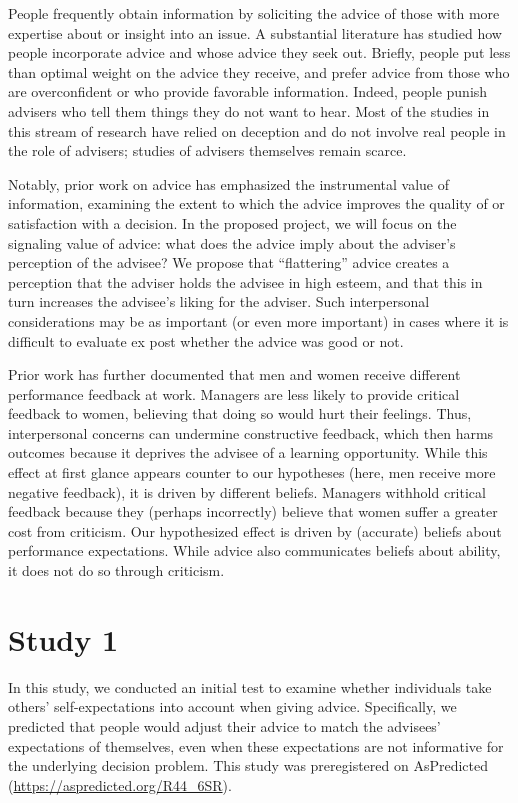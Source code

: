 \documentclass[
  man,floatsintext]{apa6}
\begin{document}
People frequently obtain information by soliciting the advice of those with more expertise about or insight into an issue. A substantial literature has studied how people incorporate advice and whose advice they seek out. Briefly, people put less than optimal weight on the advice they receive, and prefer advice from those who are overconfident or who provide favorable information. Indeed, people punish advisers who tell them things they do not want to hear. Most of the studies in this stream of research have relied on deception and do not involve real people in the role of advisers; studies of advisers themselves remain scarce.

Notably, prior work on advice has emphasized the instrumental value of information, examining the extent to which the advice improves the quality of or satisfaction with a decision. In the proposed project, we will focus on the signaling value of advice: what does the advice imply about the adviser's perception of the advisee? We propose that ``flattering'' advice creates a perception that the adviser holds the advisee in high esteem, and that this in turn increases the advisee's liking for the adviser. Such interpersonal considerations may be as important (or even more important) in cases where it is difficult to evaluate ex post whether the advice was good or not.

Prior work has further documented that men and women receive different performance feedback at work. Managers are less likely to provide critical feedback to women, believing that doing so would hurt their feelings. Thus, interpersonal concerns can undermine constructive feedback, which then harms outcomes because it deprives the advisee of a learning opportunity. While this effect at first glance appears counter to our hypotheses (here, men receive more negative feedback), it is driven by different beliefs. Managers withhold critical feedback because they (perhaps incorrectly) believe that women suffer a greater cost from criticism. Our hypothesized effect is driven by (accurate) beliefs about performance expectations. While advice also communicates beliefs about ability, it does not do so through criticism.

\hypertarget{study-1}{%
\section{Study 1}\label{study-1}}

In this study, we conducted an initial test to examine whether individuals take others' self-expectations into account when giving advice. Specifically, we predicted that people would adjust their advice to match the advisees' expectations of themselves, even when these expectations are not informative for the underlying decision problem. This study was preregistered on AsPredicted (\url{https://aspredicted.org/R44_6SR}).
\end{document}
